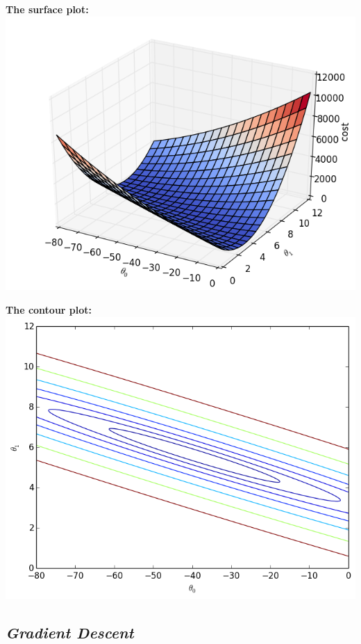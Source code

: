 \documentclass[11pt,a4paper,oneside]{report}
\begin{document}
\begin{center}
{\bf The surface plot: }\\
\includegraphics[scale=.6]{cost.png}\\
\end{center}
\vspace{1in}
\begin{center}
{\bf The contour plot: }\\
\includegraphics[scale=.5]{costContour.png}
\end{center}
\newpage

{\center\color{magenta}
\subsection*{\it\huge Gradient Descent}}
\end{document}
